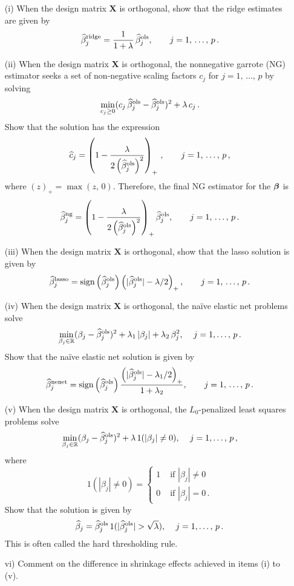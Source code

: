 \documentclass[11pt]{report}
\newcommand{\bfmath}[1]{\mbox{\boldmath$#1$\unboldmath}}
\begin{document}
\begin{itemize}
\item[(i) ] When the design matrix $\mathbf{X}$ is orthogonal, show that the ridge estimates are given by
$$\widehat{\beta}_j^{\rm ridge}=\dfrac{1}{1+\lambda}\,\widehat{\beta}_j^{\rm ols},\qquad j=1,\,\dots,\,p\,.$$ 
\item[(ii) ] When the design matrix $\mathbf{X}$ is orthogonal, the nonnegative garrote (NG) estimator seeks a set of non-negative scaling factors $c_j$ for $j=1,\,\dots,\,p$ by solving 
$$\min\limits_{c_j\geq 0}(c_j\,\widehat{\beta}_j^{\rm ols}-\widehat{\beta}_j^{\rm ols})^2+\lambda\,c_j\,.$$
Show that the solution has the expression
$$\widehat{c}_j=\left(1-\dfrac{\lambda}{2\left(\widehat{\beta}_j^{\rm ols} \right)^2} \right)_+\,,\qquad j=1,\,\dots,\,p\,,$$
where $(z)_+=\max(z,\,0)$. Therefore, the final NG estimator for the $\bfmath{\beta}$ is 
$$\widehat{\beta}_j^{\rm ng}=\left(1-\dfrac{\lambda}{2\left(\widehat{\beta}_j^{\rm ols} \right)^2} \right)_+\widehat{\beta}_j^{\rm ols},\qquad j=1,\,\dots,\,p\,. $$ 
\item[(iii) ] When the design matrix $\mathbf{X}$ is orthogonal, show that the lasso solution is given by 
$$\widehat{\beta}_j^{\rm lasso}=\text{sign}\left(\widehat{\beta}_j^{\rm ols}\right)\left(|\widehat{\beta}_j^{\rm ols}|-\lambda/2 \right)_+,\qquad j=1,\,\dots,\,p\,. $$ 
\item[(iv) ] When the design matrix $\mathbf{X}$ is orthogonal, the na\"{i}ve elastic net problems solve 
$$\min\limits_{\beta_j\in\mathbb{R}}(\beta_j-\widehat{\beta}_j^{\rm ols})^2+\lambda_1\,|\beta_j|+\lambda_2\,\beta_j^2,\,\quad j=1,\dots,\,p\,.$$
Show that the na\"{i}ve elastic net  solution is given by 
$$\widehat{\beta}_j^{\rm nenet}=\text{sign}\left(\widehat{\beta}_j^{\rm ols}\right)\dfrac{\left(|\widehat{\beta}_j^{\rm ols}|-\lambda_1/2 \right)_+}{1+\lambda_2},\qquad j=1,\,\dots,\,p\,. $$ 
\item[(v) ] When the design matrix $\mathbf{X}$ is orthogonal, the $L_0$-penalized least squares problems solve 
$$\min\limits_{\beta_j\in\mathbb{R}}(\beta_j-\widehat{\beta}_j^{\rm ols})^2+\lambda\,1(|\beta_j|\neq 0),\,\quad j=1,\dots,\,p\,,$$
where $$1(|\beta_j|\neq 0)=\begin{cases}
1 & \text{ if } |\beta_j|\neq 0\\
0 & \text{ if } |\beta_j|= 0\,.
\end{cases}$$
Show that the solution is given by
$$\widehat{\beta}_j=\widehat{\beta}_j^{\rm ols}\,1(|\widehat{\beta}_j^{\rm ols}|>\sqrt{\lambda}),\,\quad j=1,\dots,\,p\,.$$
This is often called the hard thresholding rule.
\item[vi) ] Comment on the difference in shrinkage effects achieved in items (i) to (v).
\end{itemize}
\vspace{1mm}
\end{document}
